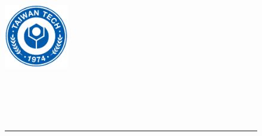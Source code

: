 
\newcommand\itsempty{}
%
\begin{titlepage}

\begin{center}
%



\begin{figure}[htbp]
	\begin{minipage}[b]{5cm} 
		\raggedright

		\includegraphics[width=1.1in]{figures/ntust_logo.eps}

		\label{fig:ntust_logo}
	\end{minipage}%
	\begin{minipage}[b]{0.5\textwidth} 
	\centering
	\makebox[3cm][c]{\Huge{\univCname}}\\  %
	\vspace{0.5cm}
	\makebox[3cm][c]{\Huge{\deptCname}}\\ %
	\vspace{0.5cm}
	\end{minipage}%
\\ 
\rule{16cm}{3pt}
\end{figure}



\end{center}
\end{titlepage}
